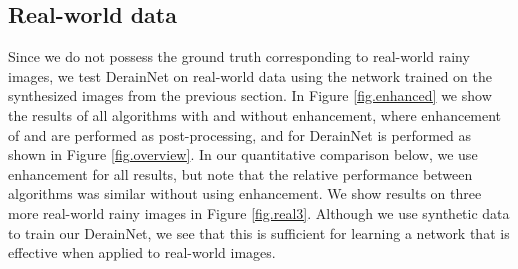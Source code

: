 \documentclass[journal]{IEEEtran}
\begin{document}
\subsection{Real-world data}
Since we do not possess the ground truth corresponding to real-world rainy images, we test DerainNet on real-world data using the network trained on the  synthesized images from the previous section. In Figure \ref{fig.enhanced} we show the results of all algorithms with and without enhancement, where enhancement of \cite{13,16} and \cite{34} are performed as post-processing, and for DerainNet is performed as shown in Figure \ref{fig.overview}. In our quantitative comparison below, we use enhancement for all results, but note that the relative performance between algorithms was similar without using enhancement. We show results on three more real-world rainy images in Figure \ref{fig.real3}. Although we use synthetic data to train our DerainNet, we see that this is sufficient for learning a network that is effective when applied to real-world images.
\begin{figure*}
\begin{center}
\\
\end{center}\vspace{-5pt}
\caption{Comparison of algorithms on a real-world ``soccer'' image with and without enhancement.}\label{fig.enhanced}
\end{figure*}
\end{document}
